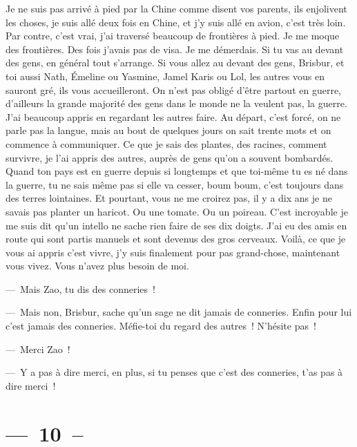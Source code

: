 \documentclass[french,twoside]{book} %
\begin{document}
\noindent Je ne suis pas arrivé à pied par la Chine comme disent vos parents, ils enjolivent les choses, je suis allé deux fois en Chine, et j’y suis allé en avion, c’est très loin. Par contre, c’est vrai, j’ai traversé beaucoup de frontières à pied. Je me moque des frontières. Des fois j’avais pas de visa. Je me démerdais. Si tu vas au devant des gens, en général tout s’arrange. Si vous allez au devant des gens, Brisbur, et toi aussi Nath, Émeline ou Yasmine, Jamel Karis ou Lol, les autres vous en sauront gré, ils vous accueilleront. On n’est pas obligé d’être partout en guerre, d’ailleurs la grande majorité des gens dans le monde ne la veulent pas, la guerre. J’ai beaucoup appris en regardant les autres faire. Au départ, c’est forcé, on ne parle pas la langue, mais au bout de quelques jours on sait trente mots et on commence à communiquer. Ce que je sais des plantes, des racines, comment survivre, je l’ai appris des autres, auprès de gens qu’on a souvent bombardés. Quand ton pays est en guerre depuis si longtemps et que toi-même tu es né dans la guerre, tu ne sais même pas si elle va cesser, boum boum, c’est toujours dans des terres lointaines. Et pourtant, vous ne me croirez pas, il y a dix ans je ne savais pas planter un haricot. Ou une tomate. Ou un poireau. C’est incroyable je me suis dit qu’un intello ne sache rien faire de ses dix doigts. J’ai eu des amis en route qui sont partis manuels et sont devenus des gros cerveaux. Voilà, ce que je vous ai appris c’est vivre, j’y suis finalement pour pas grand-chose, maintenant vous vivez. Vous n’avez plus besoin de moi.\par
— Mais Zao, tu dis des conneries !\par
— Mais non, Brisbur, sache qu’un sage ne dit jamais de conneries. Enfin pour lui c’est jamais des conneries. Méfie-toi du regard des autres ! N’hésite pas !\par
— Merci Zao !\par
— Y a pas à dire merci, en plus, si tu penses que c’est des conneries, t’as pas à dire merci !
\section[{— 10 –}]{— 10 –}\renewcommand{\leftmark}{— 10 –}
\end{document}
